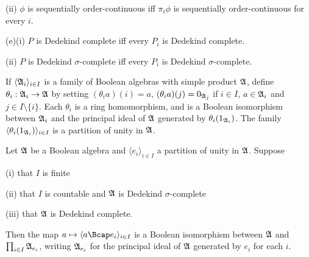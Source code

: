 \quad (ii) $\phi$ is sequentially order-continuous iff $\pi_i\phi$ is
sequentially order-continuous for every $i$.

(e)(i) $P$ is Dedekind complete iff every $P_i$ is Dedekind complete.

\quad (ii) $P$ is Dedekind $\sigma$-complete iff every $P_i$ is Dedekind
$\sigma$-complete.


   If $\langle\frak A_i\rangle_{i\in I}$
is a family of Boolean algebras with simple product $\frak A$, define
$\theta_i:\frak A_i\to\frak A$ by setting $(\theta_i a)(i)=a$,
$(\theta_i a)(j)=0_{\frak A_j}$ if $i\in I$, $a\in \frak A_i$ and $j\in
I\setminus\{i\}$.   Each $\theta_i$ is a ring homomorphism, and is a
Boolean isomorphism between $\frak A_i$ and the principal ideal of
$\frak A$ generated by $\theta_i(1_{\frak A_i})$.   The family
$\langle\theta_i(1_{\frak A_i})\rangle_{i\in I}$ is a partition of unity
in $\frak A$.


 Let $\frak A$ be a Boolean algebra and
$\langle e_i\rangle_{i\in I}$ a partition of unity in $\frak A$.
Suppose

 (i) that $I$ is finite

 (ii) that $I$ is countable and $\frak A$ is Dedekind
$\sigma$-complete

 (iii) that $\frak A$ is Dedekind complete.

\noindent Then the map $a\mapsto\langle a\Bcap e_i\rangle_{i\in I}$ is a
Boolean isomorphism between $\frak A$ and $\prod_{i\in I}\frak A_{e_i}$,
writing $\frak A_{e_i}$ for the principal ideal of $\frak A$ generated
by $e_i$ for each $i$.


